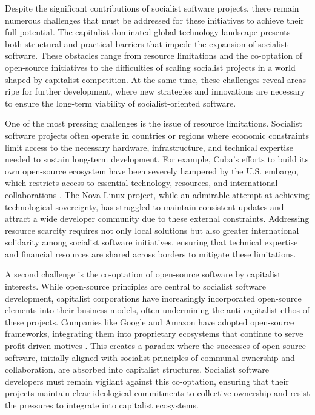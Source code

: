 \begin{refsection}
Despite the significant contributions of socialist software projects, there remain numerous challenges that must be addressed for these initiatives to achieve their full potential. The capitalist-dominated global technology landscape presents both structural and practical barriers that impede the expansion of socialist software. These obstacles range from resource limitations and the co-optation of open-source initiatives to the difficulties of scaling socialist projects in a world shaped by capitalist competition. At the same time, these challenges reveal areas ripe for further development, where new strategies and innovations are necessary to ensure the long-term viability of socialist-oriented software.

One of the most pressing challenges is the issue of resource limitations. Socialist software projects often operate in countries or regions where economic constraints limit access to the necessary hardware, infrastructure, and technical expertise needed to sustain long-term development. For example, Cuba's efforts to build its own open-source ecosystem have been severely hampered by the U.S. embargo, which restricts access to essential technology, resources, and international collaborations \cite[pp.~158-160]{feinberg2016}. The Nova Linux project, while an admirable attempt at achieving technological sovereignty, has struggled to maintain consistent updates and attract a wide developer community due to these external constraints. Addressing resource scarcity requires not only local solutions but also greater international solidarity among socialist software initiatives, ensuring that technical expertise and financial resources are shared across borders to mitigate these limitations.

A second challenge is the co-optation of open-source software by capitalist interests. While open-source principles are central to socialist software development, capitalist corporations have increasingly incorporated open-source elements into their business models, often undermining the anti-capitalist ethos of these projects. Companies like Google and Amazon have adopted open-source frameworks, integrating them into proprietary ecosystems that continue to serve profit-driven motives \cite[pp.~110-113]{moody2002}. This creates a paradox where the successes of open-source software, initially aligned with socialist principles of communal ownership and collaboration, are absorbed into capitalist structures. Socialist software developers must remain vigilant against this co-optation, ensuring that their projects maintain clear ideological commitments to collective ownership and resist the pressures to integrate into capitalist ecosystems.


\end{refsection}

